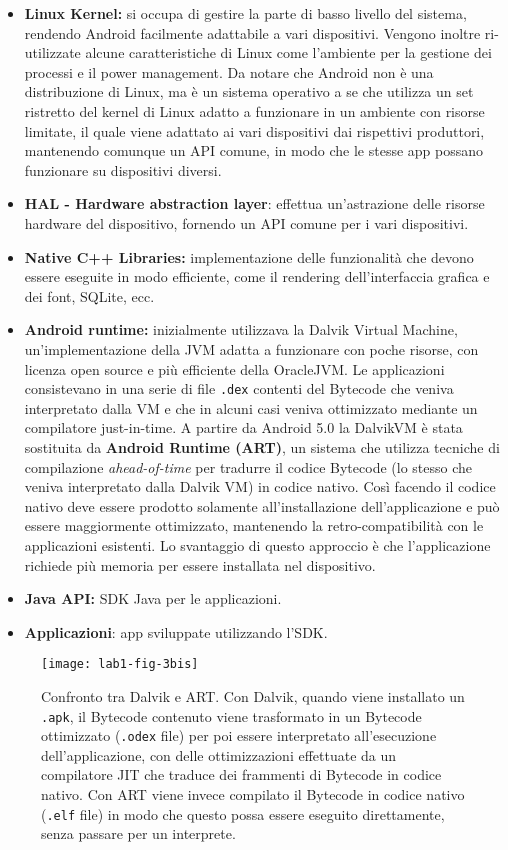 \begin{itemize}
	\item \textbf{Linux Kernel:} si occupa di gestire la parte di basso livello
		del sistema, rendendo Android facilmente adattabile a vari
		dispositivi. Vengono inoltre ri-utilizzate alcune caratteristiche di
		Linux come l'ambiente per la gestione dei processi e il power
		management. Da notare che Android non è una distribuzione di Linux, ma
		è un sistema operativo a se che utilizza un set ristretto del kernel
		di Linux adatto a funzionare in un ambiente con risorse limitate, il
		quale viene adattato ai vari dispositivi dai rispettivi produttori,
		mantenendo comunque un API comune, in modo che le stesse app possano
		funzionare su dispositivi diversi.
	\item
		\textbf{HAL - Hardware abstraction layer}: effettua un'astrazione
		delle risorse hardware del dispositivo, fornendo un API comune per i
		vari dispositivi.
	\item
		\textbf{Native C++ Libraries:} implementazione delle funzionalità che
		devono essere eseguite in modo efficiente, come il rendering
		dell'interfaccia grafica e dei font, SQLite, ecc.
	\item
		\textbf{Android runtime:} inizialmente utilizzava la Dalvik Virtual
		Machine, un'implementazione della JVM adatta a funzionare con poche
		risorse, con licenza open source e più efficiente della OracleJVM. Le
		applicazioni consistevano in una serie di file \texttt{.dex} contenti del
		Bytecode che veniva interpretato dalla VM e che in alcuni casi veniva
		ottimizzato mediante un compilatore just-in-time. A partire da Android
		5.0 la DalvikVM è stata sostituita da \textbf{Android Runtime (ART)},
		un sistema che utilizza tecniche di compilazione \textit{ahead-of-time} per
		tradurre il codice Bytecode (lo stesso che veniva interpretato dalla
		Dalvik VM) in codice nativo. Così facendo il codice nativo deve essere
		prodotto solamente all'installazione dell'applicazione e può essere
		maggiormente ottimizzato, mantenendo la retro-compatibilità con le
		applicazioni esistenti. Lo svantaggio di questo approccio è che
		l'applicazione richiede più memoria per essere installata nel
		dispositivo.
	\item
		\textbf{Java API:} SDK Java per le applicazioni.
	\item
		\textbf{Applicazioni}: app sviluppate utilizzando l'SDK.
\end{itemize}

\begin{figure}[htbp]
	\centering
	\texttt{[image: lab1-fig-3bis]}
	\caption[Confronto tra Dalvik e ART]{Confronto tra Dalvik e ART. Con Dalvik, quando viene installato un \texttt{.apk}, il Bytecode contenuto viene trasformato in un Bytecode ottimizzato (\texttt{.odex} file) per poi essere interpretato all'esecuzione dell'applicazione, con delle ottimizzazioni effettuate da un compilatore JIT che traduce dei frammenti di Bytecode in codice nativo. Con ART viene invece compilato il Bytecode in codice nativo (\texttt{.elf} file) in modo che questo possa essere eseguito direttamente, senza passare per un interprete.}
\end{figure}

